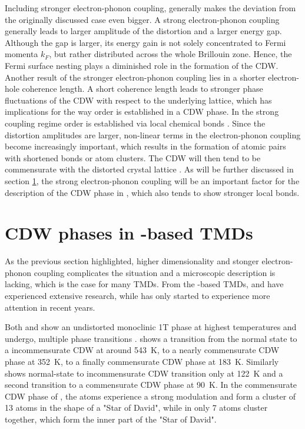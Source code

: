 Including stronger electron-phonon coupling, generally makes the deviation from the originally discussed case even bigger.
A strong electron-phonon coupling generally leads to larger amplitude of the distortion and a larger energy gap.
Although the gap is larger, its energy gain is not solely concentrated to Fermi momenta $k_F$, but rather distributed across the whole Brillouin zone.
Hence, the Fermi surface nesting plays a diminished role in the formation of the CDW.
Another result of the stronger electron-phonon coupling lies in a shorter electron-hole coherence length.
A short coherence length leads to stronger phase fluctuations of the CDW with respect to the underlying lattice, which has implications for the way order is established in a CDW phase.
In the strong coupling regime order is established via local chemical bonds \cite{rossnagel_origin_2011, whangbo_analogies_1992, mcmillan_microscopic_1977,haas_chemical_1978,inglesfield_bonding_1980}.
Since the distortion amplitudes are larger, non-linear terms in the electron-phonon coupling become increasingly important, which results in the formation of atomic pairs with shortened bonds or atom clusters.
The CDW will then tend to be commensurate with the distorted crystal lattice \cite{rossnagel_origin_2011}.
As will be further discussed in section \ref{sec:cdw_tate2}, the strong electron-phonon coupling will be an important factor for the description of the CDW phase in , which also tends to show stronger local bonds.


\section{CDW phases in -based TMDs}
\label{sec:cdw_tate2}

As the previous section highlighted, higher dimensionality and stonger electron-phonon coupling complicates the situation and a microscopic description is lacking, which is the case for many TMDs.
From the -based TMDs,  and  have experienced extensive research, while  has only started to experience more attention in recent years.

Both  and  show an undistorted monoclinic 1T phase at highest temperatures and undergo, multiple phase transitions \cite{pouget_structural_2024,lin_evidence_2022}.
 shows a transition from the normal state to a incommensurate CDW at around \qty{543}{\kelvin}, to a nearly commensurate CDW phase at \qty{352}{\kelvin}, to a finally commensurate CDW phase at \qty{183}{\kelvin}.
Similarly  shows normal-state to incommensurate CDW transition only at \qty{122}{\kelvin} and a second transition to a commensurate CDW phase at \qty{90}{\kelvin}.
In the commensurate CDW phase of , the  atoms experience a strong modulation and form a cluster of 13 atoms in the shape of a "Star of David", while in  only 7 atoms cluster together, which form the inner part of the "Star of David".

